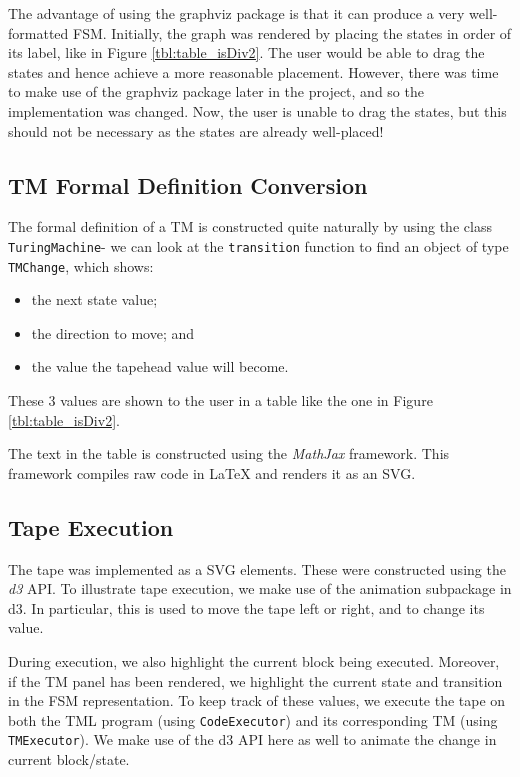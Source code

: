 The advantage of using the graphviz package is that it can produce a very well-formatted FSM. Initially, the graph was rendered by placing the states in order of its label, like in Figure \ref{tbl:table_isDiv2}. The user would be able to drag the states and hence achieve a more reasonable placement. However, there was time to make use of the graphviz package later in the project, and so the implementation was changed. Now, the user is unable to drag the states, but this should not be necessary as the states are already well-placed!

\subsection{TM Formal Definition Conversion}

The formal definition of a TM is constructed quite naturally by using the class \texttt{TuringMachine}- we can look at the \texttt{transition} function to find an object of type \texttt{TMChange}, which shows:
\begin{itemize}
    \item the next state value;
    \item the direction to move; and
    \item the value the tapehead value will become.
\end{itemize}
These 3 values are shown to the user in a table like the one in Figure \ref{tbl:table_isDiv2}.

The text in the table is constructed using the \emph{MathJax} framework. This framework compiles raw code in LaTeX and renders it as an SVG.

\subsection{Tape Execution}

The tape was implemented as a SVG elements. These were constructed using the \emph{d3} API. To illustrate tape execution, we make use of the animation subpackage in d3. In particular, this is used to move the tape left or right, and to change its value. 

During execution, we also highlight the current block being executed. Moreover, if the TM panel has been rendered, we highlight the current state and transition in the FSM representation. To keep track of these values, we execute the tape on both the TML program (using \texttt{CodeExecutor}) and its corresponding TM (using \texttt{TMExecutor}). We make use of the d3 API here as well to animate the change in current block/state.
